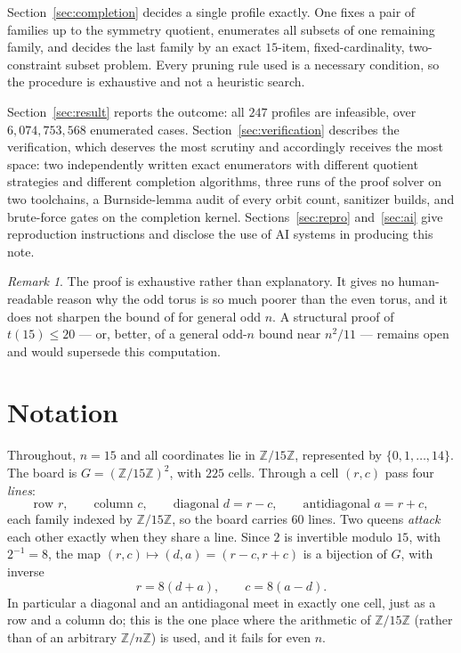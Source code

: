 \documentclass[11pt]{amsart}
\theoremstyle{remark}
\newtheorem{remark}[theorem]{Remark}
\newcommand{\Z}{\mathbb{Z}}
\newcommand{\Zn}{\Z/15\Z}
\begin{document}
Section~\ref{sec:completion} decides a single profile exactly. One fixes a pair of families up to the symmetry quotient, enumerates all subsets of one remaining family, and decides the last family by an exact $15$-item, fixed-cardinality, two-constraint subset problem. Every pruning rule used is a necessary condition, so the procedure is exhaustive and not a heuristic search.

Section~\ref{sec:result} reports the outcome: all $247$ profiles are infeasible, over $6{,}074{,}753{,}568$ enumerated cases. Section~\ref{sec:verification} describes the verification, which deserves the most scrutiny and accordingly receives the most space: two independently written exact enumerators with different quotient strategies and different completion algorithms, three runs of the proof solver on two toolchains, a Burnside-lemma audit of every orbit count, sanitizer builds, and brute-force gates on the completion kernel. Sections~\ref{sec:repro} and~\ref{sec:ai} give reproduction instructions and disclose the use of AI systems in producing this note.

\begin{remark}
The proof is exhaustive rather than explanatory. It gives no human-readable reason why the odd torus is so much poorer than the even torus, and it does not sharpen the bound of \cite{CDHS24} for general odd $n$. A structural proof of $t(15)\le 20$ --- or, better, of a general odd-$n$ bound near $n^2/11$ --- remains open and would supersede this computation.
\end{remark}

\section{Notation}\label{sec:notation}

Throughout, $n=15$ and all coordinates lie in $\Zn$, represented by $\{0,1,\dots,14\}$. The board is $G=(\Zn)^2$, with $225$ cells. Through a cell $(r,c)$ pass four \emph{lines}:
\[
\text{row } r,\qquad \text{column } c,\qquad \text{diagonal } d=r-c,\qquad \text{antidiagonal } a=r+c ,
\]
each family indexed by $\Zn$, so the board carries $60$ lines. Two queens \emph{attack} each other exactly when they share a line. Since $2$ is invertible modulo $15$, with $2^{-1}=8$, the map $(r,c)\mapsto(d,a)=(r-c,r+c)$ is a bijection of $G$, with inverse
\begin{equation}\label{eq:inverse}
r=8(d+a),\qquad c=8(a-d).
\end{equation}
In particular a diagonal and an antidiagonal meet in exactly one cell, just as a row and a column do; this is the one place where the arithmetic of $\Zn$ (rather than of an arbitrary $\Z/n\Z$) is used, and it fails for even $n$.
\end{document}
